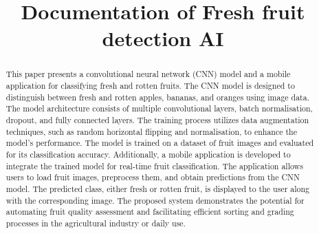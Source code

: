 \documentclass[conference]{IEEEtran}
\begin{document}
\title{Documentation of Fresh fruit detection AI}

\author{
\and
{}
\and
{}
}
\maketitle

\begin{abstract}
This paper presents a convolutional neural network (CNN) model and a mobile application for classifying fresh and rotten fruits. The CNN model is designed to distinguish between fresh and rotten apples, bananas, and oranges using image data. The model architecture consists of multiple convolutional layers, batch normalisation, dropout, and fully connected layers. The training process utilizes data augmentation techniques, such as random horizontal flipping and normalisation, to enhance the model's performance. The model is trained on a dataset of fruit images and evaluated for its classification accuracy. Additionally, a mobile application is developed to integrate the trained model for real-time fruit classification. The application allows users to load fruit images, preprocess them, and obtain predictions from the CNN model. The predicted class, either fresh or rotten fruit, is displayed to the user along with the corresponding image. The proposed system demonstrates the potential for automating fruit quality assessment and facilitating efficient sorting and grading processes in the agricultural industry or daily use.
\end{abstract}
\end{document}
